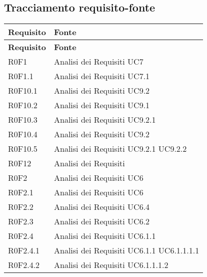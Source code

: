 \documentclass[../AnalisiDeiRequisiti.tex]{subfiles}
\begin{document}
	\subsection{Tracciamento requisito-fonte}
	\def\arraystretch{1.5}
	\begin{longtable}{p{5cm}!{\VRule[1pt]}p{5cm}}
		\color{white} \textbf{Requisito} & \color{white} \textbf{Fonte} \\ 
		\endfirsthead 
		\color{white} \textbf{Requisito} & \color{white} \textbf{Fonte} \\ 
		\endhead 
		R0F1 & Analisi dei Requisiti \newline UC7
		\\
		R0F1.1 & Analisi dei Requisiti \newline UC7.1
		\\
		R0F10.1 & Analisi dei Requisiti \newline UC9.2
		\\
		R0F10.2 & Analisi dei Requisiti \newline UC9.1
		\\
		R0F10.3 & Analisi dei Requisiti \newline UC9.2.1
		\\
		R0F10.4 & Analisi dei Requisiti \newline UC9.2
		\\
		R0F10.5 & Analisi dei Requisiti \newline UC9.2.1
		\newline UC9.2.2
		\\
		R0F12 & Analisi dei Requisiti \\
		R0F2 & Analisi dei Requisiti \newline UC6
		\\
		R0F2.1 & Analisi dei Requisiti \newline UC6
		\\
		R0F2.2 & Analisi dei Requisiti \newline UC6.4
		\\
		R0F2.3 & Analisi dei Requisiti \newline UC6.2
		\\
		R0F2.4 & Analisi dei Requisiti \newline UC6.1.1
		\\
		R0F2.4.1 & Analisi dei Requisiti \newline UC6.1.1
		\newline UC6.1.1.1.1
		\\
		R0F2.4.2 & Analisi dei Requisiti \newline UC6.1.1.1.2

\end{longtable}
\end{document}
